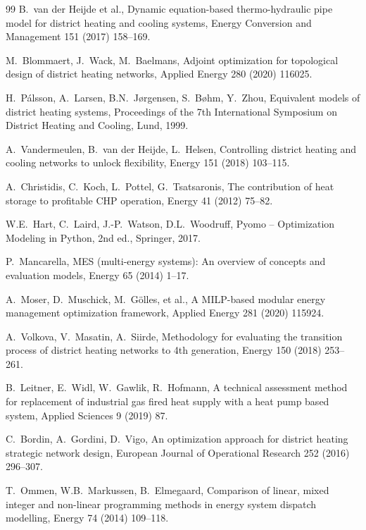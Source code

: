\documentclass[review,3p]{elsarticle}
\begin{document}
\begin{thebibliography}{99}
B.\ van der Heijde et al.,
Dynamic equation-based thermo-hydraulic pipe model for district
heating and cooling systems,
Energy Conversion and Management 151 (2017) 158--169.

M.\ Blommaert, J.\ Wack, M.\ Baelmans,
Adjoint optimization for topological design of district heating
networks,
Applied Energy 280 (2020) 116025.

H.\ Pálsson, A.\ Larsen, B.N.\ Jørgensen, S.\ Bøhm, Y.\ Zhou,
Equivalent models of district heating systems,
Proceedings of the 7th International Symposium on District Heating
and Cooling, Lund, 1999.

A.\ Vandermeulen, B.\ van der Heijde, L.\ Helsen,
Controlling district heating and cooling networks to unlock
flexibility,
Energy 151 (2018) 103--115.

A.\ Christidis, C.\ Koch, L.\ Pottel, G.\ Tsatsaronis,
The contribution of heat storage to profitable CHP operation,
Energy 41 (2012) 75--82.

W.E.\ Hart, C.\ Laird, J.-P.\ Watson, D.L.\ Woodruff,
Pyomo -- Optimization Modeling in Python, 2nd ed., Springer, 2017.

P.\ Mancarella,
MES (multi-energy systems): An overview of concepts and evaluation
models,
Energy 65 (2014) 1--17.

A.\ Moser, D.\ Muschick, M.\ Gölles, et al.,
A MILP-based modular energy management optimization framework,
Applied Energy 281 (2020) 115924.

A.\ Volkova, V.\ Masatin, A.\ Siirde,
Methodology for evaluating the transition process of district
heating networks to 4th generation,
Energy 150 (2018) 253--261.

B.\ Leitner, E.\ Widl, W.\ Gawlik, R.\ Hofmann,
A technical assessment method for replacement of industrial gas
fired heat supply with a heat pump based system,
Applied Sciences 9 (2019) 87.

C.\ Bordin, A.\ Gordini, D.\ Vigo,
An optimization approach for district heating strategic network
design,
European Journal of Operational Research 252 (2016) 296--307.

T.\ Ommen, W.B.\ Markussen, B.\ Elmegaard,
Comparison of linear, mixed integer and non-linear programming
methods in energy system dispatch modelling,
Energy 74 (2014) 109--118.


\end{thebibliography}
\end{document}
